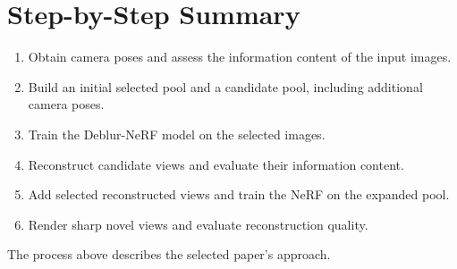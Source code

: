 \section{Step-by-Step Summary}
\begin{enumerate}
\item Obtain camera poses and assess the information content of the input images.
\item Build an initial selected pool and a candidate pool, including additional camera poses.
\item Train the Deblur-NeRF model on the selected images.
\item Reconstruct candidate views and evaluate their information content.
\item Add selected reconstructed views and train the NeRF on the expanded pool.
\item Render sharp novel views and evaluate reconstruction quality.
\end{enumerate}
The process above describes the selected paper's approach.\cite{bib1}
